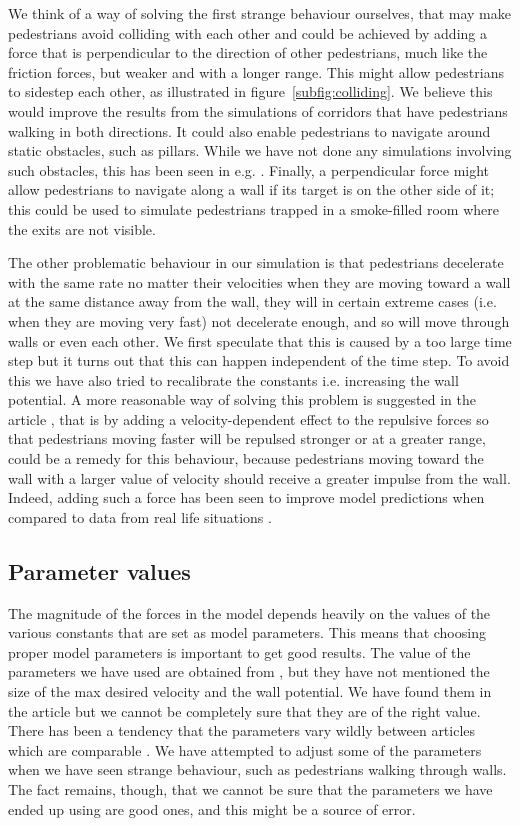 We think of a way of solving the first strange behaviour ourselves, 
that may make pedestrians avoid colliding with each other and could be 
achieved by adding a force that is perpendicular to the direction of other 
pedestrians, much like the friction forces, but weaker and with a longer range. 
This might allow pedestrians to sidestep each other, as illustrated in 
figure~\ref{subfig:colliding}. We believe this would improve the results from 
the simulations of corridors that have pedestrians walking in both directions.  
It could also enable pedestrians to navigate around static obstacles, such as 
pillars. While we have not done any simulations involving such obstacles, this 
has been seen in e.g. \cite{tang}. Finally, a perpendicular force might allow 
pedestrians to navigate along a wall if its target is on the other side of it; 
this could be used to simulate pedestrians trapped in a smoke-filled room 
where the exits are not visible.

The other problematic behaviour in our simulation is that pedestrians 
decelerate with the same rate no matter their velocities when they are 
moving toward a wall at the same distance away from the wall, they 
will in certain extreme cases (i.e. when they are moving very fast) not 
decelerate enough, and so will move through walls or even each other. 
We first speculate that this is caused by a too large time step but it turns out 
that this can happen independent of the time step. To avoid this we 
have also tried to recalibrate the constants i.e. increasing the wall potential. 
A more reasonable way of solving this problem is suggested in the 
article \cite{ABconstant}, that is by adding a velocity-dependent 
effect to the repulsive forces so 
that pedestrians moving faster will be repulsed stronger or at a greater 
range, could be a remedy for this behaviour, because pedestrians moving 
toward the wall with a larger value of velocity should receive a greater impulse 
from the wall. Indeed, adding such a force has 
been seen to improve model predictions when compared to data from real life 
situations \cite{ABconstant}.

\subsection{Parameter values}
The magnitude of the forces in the model depends heavily on the values of the 
various constants that are set as model parameters. This means that choosing 
proper model parameters is important to get good results.
The value of the parameters we have used are obtained from \cite{self-org}, 
but they have not mentioned the size of the
max desired velocity and the wall potential. We have found them in the 
article \cite{social-force} but we cannot be completely sure that they are of 
the right value. There has been a tendency that the parameters vary wildly 
between articles which are comparable \cite{frebyheat} \cite{} \cite{}. We have 
attempted to adjust some of the parameters when we have seen strange 
behaviour, such as pedestrians walking through walls. The fact remains, 
though, that we cannot be sure that the parameters we have ended up using are 
good ones, and this might be a source of error.

